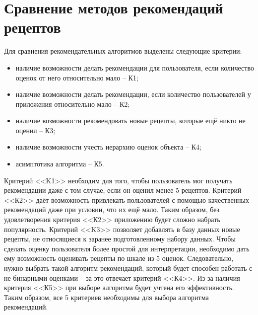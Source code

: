 \section{Сравнение методов рекомендаций рецептов}
Для сравнения рекомендательных алгоритмов выделены следующие критерии:
\begin{itemize}
    \item наличие возможности делать рекомендации для пользователя, если количество оценок от него относительно мало -- К1;
    \item наличие возможности делать рекомендации, если количество пользователей у приложения относительно мало -- К2;
    \item наличие возможности рекомендовать новые рецепты, которые ещё никто не оценил -- К3;
    \item наличие возможности учесть иерархию оценок объекта -- К4;
    \item асимптотика алгоритма -- К5.
\end{itemize}
Критерий <<K1>> необходим для того, чтобы пользователь мог получать рекомендации даже с том случае, если он оценил менее 5 рецептов.
Критерий <<К2>> даёт возможность привлекать пользователей с помощью качественных рекомендаций даже при условии, что их ещё мало.
Таким образом, без удовлетворения критерия <<К2>> приложению будет сложно набрать популярность.
Критерий <<K3>> позволяет добавлять в базу данных новые рецепты, не относящиеся к заранее подготовленному набору данных.
Чтобы сделать оценку пользователя более простой для интерпретации, необходимо дать ему возможность оценивать рецепты по шкале из 5 оценок.
Следовательно, нужно выбрать такой алгоритм рекомендаций, который будет способен работать с не бинарными оценками -- за это отвечает критерий <<К4>>.
Из-за наличия критерия <<К5>> при выборе алгоритма будет учтена его эффективность.
Таким образом, все 5 критериев необходимы для выбора алгоритма рекомендаций.
 
